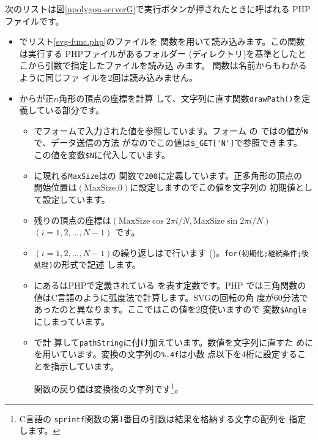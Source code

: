 \begin{itemize}
次のリストは図\ref{npolygon-serverG}で実行ボタンが押されたときに呼ばれる
PHPファイルです。
\begin{itemize}
 \item {}でリスト\ref{svg-func.php}のファイルを
       関数を用いて読み込みます。この関数は実行する
       PHPファイルがあるフォルダー
       (ディレクトリ)を基準としたとこから引数で指定したファイルを読み込
       みます。 関数は名前からもわかるように同じファ
       イルを2回は読み込みません。
 \item {}からが正$n$角形の頂点の座標を計算
       して、文字列に直す関数\texttt{drawPath()}を定義している部分です。
\begin{itemize}
 \item {}でフォームで入力された値を参照しています。フォーム
       の
       ではの値が\texttt{N}で、データ送信の方法
       がなのでこの値は\verb+$_GET['N']+で参照できます。
       この値を変数\verb+$N+に代入しています。
 \item {}に現れる\texttt{MaxSize}はの
       関数で\texttt{200}に定義しています。正多角形の頂点の
       開始位置は$(\textrm{MaxSize,0})$に設定しますのでこの値を文字列の
       初期値として設定しています。
 \item 残りの頂点の座標は$(\textrm{MaxSize}\cos 2\pi
       i/N,\textrm{MaxSize}\sin 2\pi i/N)$ 
       $(i=1,2,\ldots,N-1)$ です。
 \item $(i=1,2,\ldots,N-1)$の繰り返しはで行います
       ()。\texttt{for(初期化;継続条件;後処理)}の形式で記述
       します。
 \item {}にあるはPHPで定義されている
       を表す定数です。PHP
       では三角関数の値はC言語のように弧度法で計算します。SVGの回転の角
       度が60分法であったのと異なります。ここではこの値を2度使いますので
       変数\verb+$Angle+にしまっています。
  \item {}で計
       算して\texttt{pathString}に付け加えています。数値を文字列に直すた
       めにを用いています。変換の文字列の\Verb+%
       点以下を4桁に設定することを指示しています。

       関数の戻り値は変換後の文字列です\footnote{C言語の
		\texttt{sprintf}関数の第1番目の引数は結果を格納する文字の配列を
	指定します。}。


\end{itemize}
\end{itemize}
\end{itemize}
